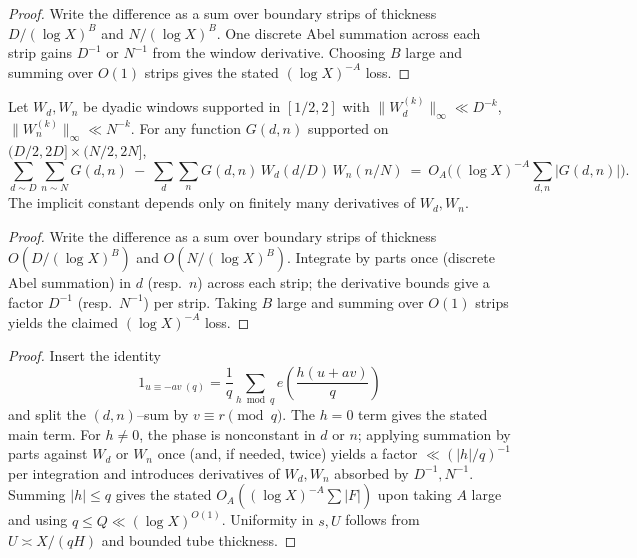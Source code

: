 \begin{proof}
Write the difference as a sum over boundary strips of thickness $D/(\log X)^B$ and $N/(\log X)^B$. One discrete Abel summation across each strip gains $D^{-1}$ or $N^{-1}$ from the window derivative. Choosing $B$ large and summing over $O(1)$ strips gives the stated $(\log X)^{-A}$ loss.
\end{proof}

\begin{lemma}\label{lem:smooth-sbp}
Let $W_d,W_n$ be dyadic windows supported in $[1/2,2]$ with $\|W_d^{(k)}\|_\infty\ll D^{-k}$, $\|W_n^{(k)}\|_\infty\ll N^{-k}$. For any function $G(d,n)$ supported on $(D/2,2D]\times(N/2,2N]$,
\[
\sum_{d\sim D}\sum_{n\sim N} G(d,n)\ -\ \sum_{d}\sum_{n} G(d,n)\,W_d(d/D)\,W_n(n/N)
\ =\ O_A\bigl((\log X)^{-A}\sum_{d,n}|G(d,n)|\bigr).
\]
The implicit constant depends only on finitely many derivatives of $W_d,W_n$.
\end{lemma}

\begin{proof}
Write the difference as a sum over boundary strips of thickness $O(D/(\log X)^B)$ and $O(N/(\log X)^B)$. Integrate by parts once (discrete Abel summation) in $d$ (resp.\ $n$) across each strip; the derivative bounds give a factor $D^{-1}$ (resp.\ $N^{-1}$) per strip. Taking $B$ large and summing over $O(1)$ strips yields the claimed $(\log X)^{-A}$ loss.
\end{proof}


\begin{proof}
Insert the identity
\[
1_{u\equiv -av\ (q)}=\frac1q\sum_{h\bmod q}e\!\left(\frac{h(u+av)}{q}\right)
\]
and split the $(d,n)$–sum by $v\equiv r\pmod q$. The $h=0$ term gives the stated main term. For $h\neq 0$, the phase is nonconstant in $d$ or $n$; applying summation by parts against $W_d$ or $W_n$ once (and, if needed, twice) yields a factor $\ll (|h|/q)^{-1}$ per integration and introduces derivatives of $W_d,W_n$ absorbed by $D^{-1},N^{-1}$. Summing $|h|\le q$ gives the stated $O_A((\log X)^{-A}\sum|F|)$ upon taking $A$ large and using $q\le Q\ll (\log X)^{O(1)}$. Uniformity in $s,U$ follows from $U\asymp X/(qH)$ and bounded tube thickness.
\end{proof}

